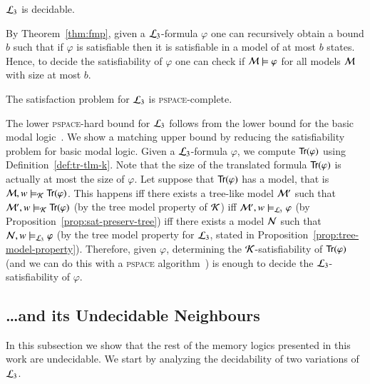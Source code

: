 \begin{cor}[Decidability]\label{cor:tlm-decidability}
$\mathcal{L}_3$ is decidable.
\end{cor}

\begin{pf}
By Theorem~\ref{thm:fmp}, given a $\mathcal{L}_3$-formula $\varphi$ one
can recursively obtain a bound $b$ such that if $\varphi$ is
satisfiable then it is satisfiable in a model of at most $b$ states.
Hence, to decide the satisfiability of $\varphi$ one can check if
$\mathcal{M}\models\varphi$ for all models $\mathcal{M}$ with size at most
$b$.
\end{pf}

\begin{thm}
The satisfaction problem for $\mathcal{L}_3$ is \textsc{pspace}-complete.
\end{thm}
\begin{pf}
The lower \textsc{pspace}-hard bound for $\mathcal{L}_3$ follows from the
lower bound for the basic modal logic~\cite{BRV01}. We show a
matching upper bound by reducing the satisfiability problem for
basic modal logic. Given a $\mathcal{L}_3$-formula $\varphi$, we compute
${\sf Tr}(\varphi)$ using Definition~\ref{def:tr-tlm-k}. Note that the
size of the translated formula ${\sf Tr}(\varphi)$ is actually at most
the size of $\varphi$. Let suppose that ${\sf Tr}(\varphi)$ has a model,
that is $\mathcal{M}, w \models_{\mathcal{K}} {\sf Tr}(\varphi)$. This happens iff
there exists a tree-like model $\mathcal{M}'$ such that $\mathcal{M}', w
\models_{\mathcal{K}} {\sf Tr}(\varphi)$ (by the tree model property of $\mathcal{K}$)
iff $\mathcal{M}', w \models_{\mathcal{L}_3} \varphi$ (by
Proposition~\ref{prop:sat-preserv-tree}) iff there exists a model
$\mathcal{N}$ such that $\mathcal{N},w \models_{\mathcal{L}_3} \varphi$ (by the tree
model property for $\mathcal{L}_3$, stated in
Proposition~\ref{prop:tree-model-property}). Therefore, given
$\varphi$, determining the $\mathcal{K}$-satisfiability of ${\sf Tr}(\varphi)$
(and we can do this with a \textsc{pspace} algorithm~\cite{BRV01})
is enough to decide the $\mathcal{L}_3$-satisfiability of $\varphi$.
\end{pf}

\subsection{\ldots and its Undecidable Neighbours}


In this subsection we show that the rest of the memory logics
presented in this work are undecidable. We start by analyzing the
decidability of two variations of $\mathcal{L}_3$.

